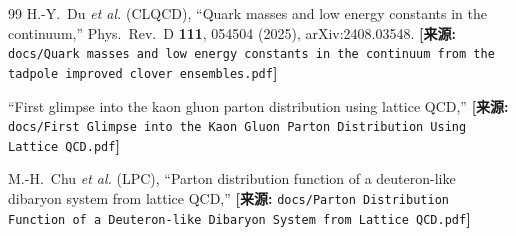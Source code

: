 \documentclass[12pt,a4paper]{ctexart}
\theoremstyle{definition}
\begin{document}
\begin{thebibliography}{99}
H.-Y.~Du \textit{et al.} (CLQCD),
``Quark masses and low energy constants in the continuum,''
Phys.\ Rev.\ D \textbf{111}, 054504 (2025), arXiv:2408.03548.
\quad\textbf{[来源:} \texttt{docs/Quark masses and low energy constants in the continuum from the tadpole improved clover ensembles.pdf}\textbf{]}

``First glimpse into the kaon gluon parton distribution using lattice QCD,''
\quad\textbf{[来源:} \texttt{docs/First Glimpse into the Kaon Gluon Parton Distribution Using Lattice QCD.pdf}\textbf{]}

M.-H.~Chu \textit{et al.} (LPC),
``Parton distribution function of a deuteron-like dibaryon system from lattice QCD,''
\quad\textbf{[来源:} \texttt{docs/Parton Distribution Function of a Deuteron-like Dibaryon System from Lattice QCD.pdf}\textbf{]}

\end{thebibliography}
\end{document}
